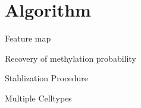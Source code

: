 \section{Algorithm}

Feature map

Recovery of methylation probability

Stablization Procedure

Multiple Celltypes
